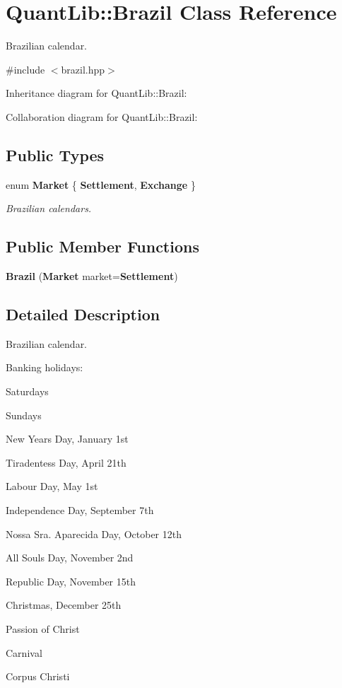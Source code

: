 \section{Quant\+Lib\+:\+:Brazil Class Reference}
\label{class_quant_lib_1_1_brazil}


Brazilian calendar.  




{\ttfamily \#include $<$brazil.\+hpp$>$}



Inheritance diagram for Quant\+Lib\+:\+:Brazil\+:


Collaboration diagram for Quant\+Lib\+:\+:Brazil\+:
\subsection*{Public Types}
\begin{DoxyCompactItemize}
\item 
enum {\bf Market} \{ {\bf Settlement}, 
{\bf Exchange}
 \}\begin{DoxyCompactList}\small\item\em Brazilian calendars. \end{DoxyCompactList}
\end{DoxyCompactItemize}
\subsection*{Public Member Functions}
\begin{DoxyCompactItemize}
\item 
{\bf Brazil} ({\bf Market} market={\bf Settlement})
\end{DoxyCompactItemize}


\subsection{Detailed Description}
Brazilian calendar. 

Banking holidays\+: 
\begin{DoxyItemize}
\item Saturdays 
\item Sundays 
\item New Year\textquotesingle{}s Day, January 1st 
\item Tiradentes\textquotesingle{}s Day, April 21th 
\item Labour Day, May 1st 
\item Independence Day, September 7th 
\item Nossa Sra. Aparecida Day, October 12th 
\item All Souls Day, November 2nd 
\item Republic Day, November 15th 
\item Christmas, December 25th 
\item Passion of Christ 
\item Carnival 
\item Corpus Christi 
\end{DoxyItemize}

